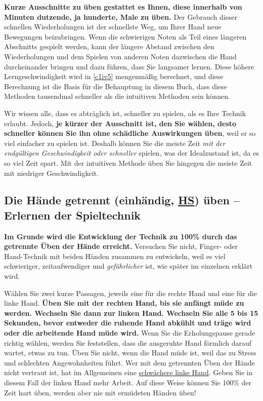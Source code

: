 \textbf{Kurze Ausschnitte zu üben gestattet es Ihnen, diese  innerhalb von Minuten dutzende, ja hunderte, Male zu üben.}
Der Gebrauch dieser schnellen Wiederholungen ist der schnellste Weg, um Ihrer Hand neue Bewegungen beizubringen.
Wenn die schwierigen Noten als Teil eines längeren Abschnitts gespielt werden, kann der längere Abstand zwischen den Wiederholungen und dem Spielen von anderen Noten dazwischen die Hand durcheinander bringen und dazu führen, dass Sie langsamer lernen.
Diese höhere Lerngeschwindigkeit wird in \hyperref[c1iv5]{\autoref{c1iv5}} mengenmäßig berechnet, und diese Berechnung ist die Basis für die Behauptung in diesem Buch, dass diese Methoden tausendmal schneller als die intuitiven Methoden sein können.

Wir wissen alle, dass es abträglich ist, schneller zu spielen, als es Ihre Technik erlaubt.
Jedoch, \textbf{je kürzer der Ausschnitt ist, den Sie wählen, desto schneller können Sie ihn ohne schädliche Auswirkungen üben}, weil er so viel einfacher zu spielen ist.
Deshalb können Sie die meiste Zeit \textit{mit der endgültigen Geschwindigkeit oder schneller} spielen, was der Idealzustand ist, da es so viel Zeit spart.
Mit der intuitiven Methode üben Sie hingegen die meiste Zeit mit niedriger Geschwindigkeit.
 

\subsection{Die Hände getrennt (einhändig, \hyperref[HsHt]{HS}) üben -- Erlernen der Spieltechnik}
\label{c1ii7}

\textbf{Im Grunde wird die Entwicklung der Technik zu 100\% durch das getrennte Üben der Hände erreicht.}
Versuchen Sie nicht, Finger- oder Hand-Technik mit beiden Händen zusammen zu entwickeln, weil es viel schwieriger, zeitaufwendiger und \textit{gefährlicher} ist, wie später im einzelnen erklärt wird.

Wählen Sie zwei kurze Passagen, jeweils eine für die rechte Hand und eine für die linke Hand.
\textbf{Üben Sie mit der rechten Hand, bis sie anfängt müde zu werden.
Wechseln Sie dann zur linken Hand.
Wechseln Sie alle 5 bis 15 Sekunden, bevor entweder die ruhende Hand abkühlt und träge wird oder die arbeitende Hand müde wird.}
Wenn Sie die Erholungspause gerade richtig wählen, werden Sie feststellen, dass die ausgeruhte Hand förmlich darauf wartet, etwas zu tun.
Üben Sie nicht, wenn die Hand müde ist, weil das zu Stress und schlechten Angewohnheiten führt.
Wer mit dem getrennten Üben der Hände nicht vertraut ist, hat im Allgemeinen eine \hyperref[c1ii20]{schwächere linke Hand}.
Geben Sie in diesem Fall der linken Hand mehr Arbeit.
Auf diese Weise können Sie 100\% der Zeit hart üben, werden aber nie mit ermüdeten Händen üben!

